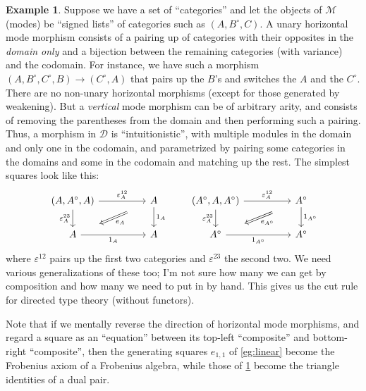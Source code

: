 \documentclass{article}
\theoremstyle{definition}
\newtheorem{eg}{Example}
\def\M{\mathcal{M}}
\def\D{\mathcal{D}}
\def\o{^{\circ}}
\begin{document}
\begin{eg}\label{eg:dirtt}
  Suppose we have a set of ``categories'' and let the objects of $\M$ (modes) be ``signed lists'' of categories such as $(A,B\o,C)$.
  A unary horizontal mode morphism consists of a pairing up of categories with their opposites in the \emph{domain only} and a bijection between the remaining categories (with variance) and the codomain.
  For instance, we have such a morphism $(A,B\o,C\o,B) \to (C\o,A)$ that pairs up the $B$'s and switches the $A$ and the $C\o$.
  There are no non-unary horizontal morphisms (except for those generated by weakening).
  But a \emph{vertical} mode morphism can be of arbitrary arity, and consists of removing the parentheses from the domain and then performing such a pairing.
  Thus, a morphism in $\D$ is ``intuitionistic'', with multiple modules in the domain and only one in the codomain, and parametrized by pairing some categories in the domains and some in the codomain and matching up the rest.
  The simplest squares look like this:
  \[\begin{tikzcd}[column sep=huge]
    (A,A\o,A) \ar[r,"\varepsilon^{12}_A"] \ar[d,swap,"\varepsilon^{23}_A"]
    \ar[from=r,to=d,phantom,""{name=1,near start},""{name=2,near end}]
    \ar[Rightarrow,from=1,to=2,"e_A"]
    & A \ar[d,"1_A"]
    \\ A \ar[r,swap,"1_A"] & A
  \end{tikzcd}
  \qquad
  \begin{tikzcd}[column sep=huge]
    (A\o,A,A\o) \ar[r,"\varepsilon^{12}_A"] \ar[d,swap,"\varepsilon^{23}_A"]
    \ar[from=r,to=d,phantom,""{name=1,near start},""{name=2,near end}]
    \ar[Rightarrow,from=1,to=2,"{e_{A\o}}"]
    & A\o \ar[d,"1_{A\o}"]
    \\ A\o \ar[r,swap,"1_{A\o}"] & A\o
  \end{tikzcd}\]
  where $\varepsilon^{12}$ pairs up the first two categories and $\varepsilon^{23}$ the second two.
  We need various generalizations of these too; I'm not sure how many we can get by composition and how many we need to put in by hand.
  This gives us the cut rule for directed type theory (without functors).
\end{eg}

Note that if we mentally reverse the direction of horizontal mode morphisms, and regard a square as an ``equation'' between its top-left ``composite'' and bottom-right ``composite'', then the generating squares $e_{1,1}$ of \cref{eg:linear} become the Frobenius axiom of a Frobenius algebra, while those of \cref{eg:dirtt} become the triangle identities of a dual pair.
\end{document}
